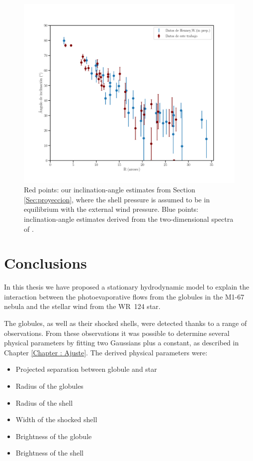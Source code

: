 \documentclass{book}
\begin{document}
\begin{figure}[htb]
    \centering
    \includegraphics[width=\textwidth]{imagenes_corregidas/W.pdf}
    \caption{Red points: our inclination-angle estimates from Section
      \ref{Sec:proyeccion}, where the shell pressure is assumed to be
      in equilibrium with the external wind pressure. Blue points:
      inclination-angle estimates derived from the two-dimensional
      spectra of \cite{Zavala:2022}.}
    \label{fig:ang_Will}
\end{figure}
\chapter{Conclusions}

In this thesis we have proposed a stationary hydrodynamic model to
explain the interaction between the photoevaporative flows from the
globules in the M1-67 nebula and the stellar wind from the WR~124
star.

The globules, as well as their shocked shells, were detected thanks to
a range of observations. From these observations it was possible to
determine several physical parameters by fitting two Gaussians plus a
constant, as described in Chapter \ref{Chapter : Ajuste}. The derived
physical parameters were:

\begin{itemize}
    \item Projected separation between globule and star
    \item Radius of the globules
    \item Radius of the shell
    \item Width of the shocked shell
    \item Brightness of the globule
    \item Brightness of the shell
\end{itemize}
\end{document}
